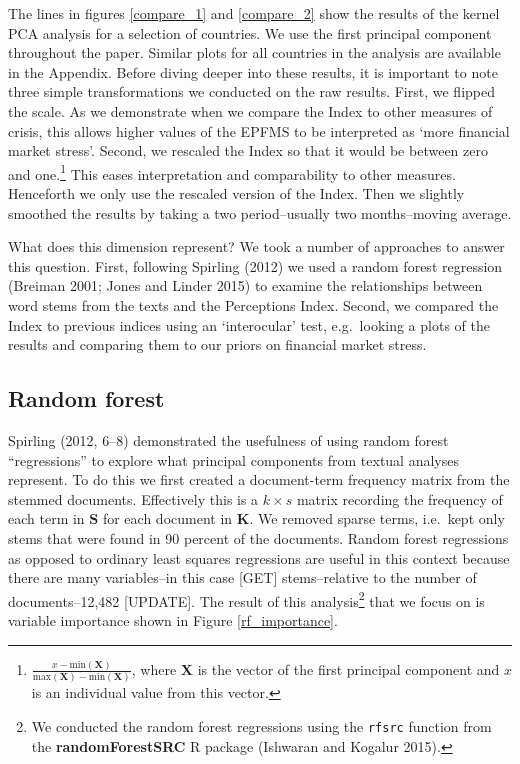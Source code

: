 \documentclass[]{article}
\let\rmarkdownfootnote\footnote%
\def\footnote{\protect\rmarkdownfootnote}
\begin{document}
The lines in figures \ref{compare_1} and \ref{compare_2} show the
results of the kernel PCA analysis for a selection of countries. We use
the first principal component throughout the paper. Similar plots for
all countries in the analysis are available in the Appendix. Before
diving deeper into these results, it is important to note three simple
transformations we conducted on the raw results. First, we flipped the
scale. As we demonstrate when we compare the Index to other measures of
crisis, this allows higher values of the EPFMS to be interpreted as
`more financial market stress'. Second, we rescaled the Index so that it
would be between zero and one.\footnote{\(\frac{x - \mathrm{min}(\bm{X})}{\mathrm{max}(\bm{X}) - \mathrm{min}(\bm{X})}\),
  where \(\bm{X}\) is the vector of the first principal component and
  \(x\) is an individual value from this vector.} This eases
interpretation and comparability to other measures. Henceforth we only
use the rescaled version of the Index. Then we slightly smoothed the
results by taking a two period--usually two months--moving average.

What does this dimension represent? We took a number of approaches to
answer this question. First, following Spirling (2012) we used a random
forest regression (Breiman 2001; Jones and Linder 2015) to examine the
relationships between word stems from the texts and the Perceptions
Index. Second, we compared the Index to previous indices using an
`interocular' test, e.g.~looking a plots of the results and comparing
them to our priors on financial market stress.

\subsection{Random forest}\label{random-forest}

Spirling (2012, 6--8) demonstrated the usefulness of using random forest
``regressions'' to explore what principal components from textual
analyses represent. To do this we first created a document-term
frequency matrix from the stemmed documents. Effectively this is a
\(k \times s\) matrix recording the frequency of each term in \(\bm{S}\)
for each document in \(\bm{K}\). We removed sparse terms, i.e.~kept only
stems that were found in 90 percent of the documents. Random forest
regressions as opposed to ordinary least squares regressions are useful
in this context because there are many variables--in this case {[}GET{]}
stems--relative to the number of documents--12,482 {[}UPDATE{]}. The
result of this analysis\footnote{We conducted the random forest
  regressions using the \texttt{rfsrc} function from the
  \textbf{randomForestSRC} R package (Ishwaran and Kogalur 2015).} that
we focus on is variable importance shown in Figure \ref{rf_importance}.
\end{document}
